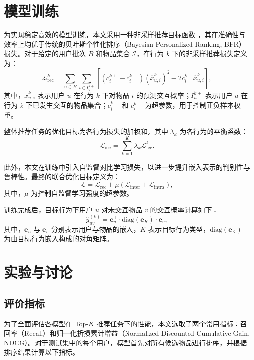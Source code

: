 \section{模型训练}
为实现稳定高效的模型训练，本文采用一种非采样推荐目标函数 \cite{chen2020EHCF}，其在准确性与效率上均优于传统的贝叶斯个性化排序（Bayesian Personalized Ranking, BPR）损失。对于给定的用户批次 $B$ 和物品集合 $\mathcal{I}$，在行为 $k$ 下的非采样推荐损失定义为：
\begin{equation}
    \mathcal{L}_{\text{rec}}^k =
    \sum_{u \in B} 
    \sum_{i \in I_u^{k+}} 
    \left[
    \left(c_i^{k+} - c_i^{k-}\right)
    \left(\hat{x}_{u,i}^k\right)^2 
    - 2c_i^{k+}\hat{x}_{u,i}^k
    \right],
\end{equation}
其中，$\hat{x}_{u,i}^k$ 表示用户 $u$ 在行为 $k$ 下对物品 $i$ 的预测交互概率；$I_u^{k+}$ 表示用户 $u$ 在行为 $k$ 下已发生交互的物品集合；$c_i^{k+}$ 和 $c_i^{k-}$ 为超参数，用于控制正负样本权重。

整体推荐任务的优化目标为各行为损失的加权和，其中 $\lambda_k$ 为各行为的平衡系数：
\begin{equation}
    \mathcal{L}_{\text{rec}} = 
    \sum_{k=1}^{K} 
    \lambda_k \mathcal{L}_{\text{rec}}^k.
\end{equation}

此外，本文在训练中引入自监督对比学习损失，以进一步提升嵌入表示的判别性与鲁棒性。最终的联合优化目标定义为：
\begin{equation}
    \mathcal{L} = 
    \mathcal{L}_{\text{rec}} + 
    \mu (\mathcal{L}_{\text{inter}} + \mathcal{L}_{\text{intra}}),
\end{equation}
其中，$\mu$ 为控制自监督学习强度的超参数。

训练完成后，目标行为下用户 $u$ 对未交互物品 $v$ 的交互概率计算如下：
\begin{equation}
    \hat{y}^{(k)}_{uv} = 
    \boldsymbol{e}_u^\top 
    \cdot 
    \text{diag}(\boldsymbol{e}_K) 
    \cdot 
    \boldsymbol{e}_v,
\end{equation}
其中，$\boldsymbol{e}_u$ 与 $\boldsymbol{e}_v$ 分别表示用户与物品的嵌入，$K$ 表示目标行为类型，$\text{diag}(\boldsymbol{e}_K)$ 为由目标行为嵌入构成的对角矩阵。

\section{实验与讨论}

\subsection{评价指标}
为了全面评估各模型在 Top-$K$ 推荐任务下的性能，本文选取了两个常用指标：召回率（Recall）和归一化折损累计增益（Normalized Discounted Cumulative Gain, NDCG）。对于测试集中的每个用户，模型首先对所有候选物品进行排序，并根据排序结果计算以下指标。

